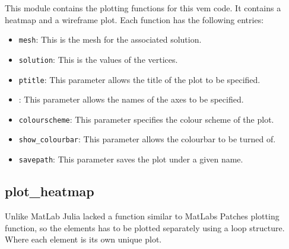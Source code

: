 \documentclass{report}
\begin{document}
This module contains the plotting functions for this vem code. It contains a heatmap and a wireframe plot. Each function has the following entries:
\begin{itemize}
    \item \texttt{mesh}: This is the mesh for the associated solution.
    \item \texttt{solution}: This is the values of the vertices.
    \item \texttt{ptitle}: This parameter allows the title of the plot to be specified.
    \item {}: This parameter allows the names of the axes to be specified.
    \item \texttt{colourscheme}: This parameter specifies the colour scheme of the plot.
    \item \texttt{show\_colourbar}: This parameter allows the colourbar to be turned of.
    \item \texttt{savepath}: This parameter saves the plot under a given name.
\end{itemize}

\subsection{plot\_heatmap}
Unlike MatLab Julia lacked a function similar to MatLabs Patches plotting function, so the elements has to be plotted separately using a loop structure. Where each element is its own unique plot.
\end{document}
